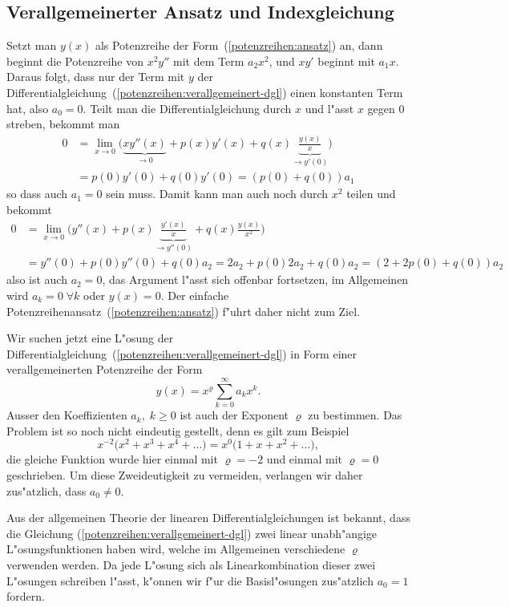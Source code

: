 \subsection{Verallgemeinerter Ansatz und Indexgleichung}
Setzt man $y(x)$ als Potenzreihe der Form~(\ref{potenzreihen:ansatz}) an,
dann beginnt die Potenzreihe von $x^2y''$ mit dem Term $a_2x^2$,
und $xy'$ beginnt mit $a_1x$.
Daraus folgt, dass nur der Term mit $y$ der
Differentialgleichung~(\ref{potenzreihen:verallgemeinert-dgl})
einen konstanten Term hat, also $a_0=0$.
Teilt man die Differentialgleichung durch $x$ und l"asst $x$ gegen $0$
streben, bekommt man
\begin{align*}
0&=
\lim_{x\to 0}\biggl(
\underbrace{xy''(x)}_{\to 0}+p(x)y'(x)+q(x)\underbrace{\frac{y(x)}{x}}_{\to y'(0)}\biggr)
\\
&=
p(0)y'(0)+q(0)y'(0)
=(p(0)+q(0))a_1
\end{align*}
so dass auch $a_1=0$ sein muss.
Damit kann man auch noch durch $x^2$ teilen und bekommt
\begin{align*}
0&=
\lim_{x\to 0}\biggl(
y''(x)+p(x)\underbrace{\frac{y'(x)}{x}}_{\to y''(0)}+q(x)\frac{y(x)}{x^2}
\biggr)
\\
&=y''(0)+p(0)y''(0)+q(0)a_2
=2a_2+p(0)2a_2+q(0)a_2
=(2+2p(0)+q(0))a_2
\end{align*}
also ist auch $a_2=0$, das Argument l"asst sich offenbar fortsetzen, 
im Allgemeinen wird $a_k=0\;\forall k$ oder $y(x)=0$.
Der einfache Potenzreihenansatz~(\ref{potenzreihen:ansatz}) f"uhrt
daher nicht zum Ziel.

Wir suchen jetzt eine L"osung der
Differentialgleichung~(\ref{potenzreihen:verallgemeinert-dgl})
in Form einer verallgemeinerten Potenzreihe der Form
\begin{equation}
y(x)=x^\varrho\sum_{k=0}^\infty a_kx^k.
\label{potenzreihen:verallgemeinert}
\end{equation}
%
Ausser den Koeffizienten $a_k,\;k\ge 0$ ist auch der Exponent
$\varrho$ zu bestimmen.
Das Problem ist so noch nicht eindeutig gestellt, denn es gilt zum Beispiel
\[
x^{-2}\bigl(x^2 + x^3 + x^4 + \dots\bigr)
=
x^{0}\bigl(1+x + x^2 + \dots\bigr),
\]
die gleiche Funktion wurde hier einmal mit $\varrho=-2$ und einmal
mit $\varrho=0$ geschrieben.
Um diese Zweideutigkeit zu vermeiden,
verlangen wir daher zus"atzlich, dass $a_0\ne 0$.

Aus der allgemeinen Theorie der linearen Differentialgleichungen
ist bekannt, dass die Gleichung (\ref{potenzreihen:verallgemeinert-dgl})
zwei linear unabh"angige L"osungsfunktionen haben wird,
welche im Allgemeinen verschiedene $\varrho$ verwenden werden.
Da jede L"osung sich als Linearkombination dieser zwei L"osungen schreiben
l"asst, k"onnen wir f"ur die Basisl"osungen zus"atzlich $a_0=1$ fordern.

